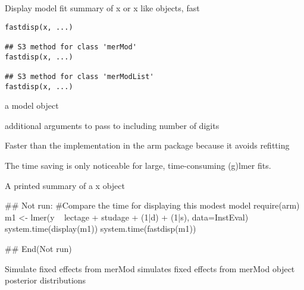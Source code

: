 \documentclass[letterpaper]{book}
\begin{document}
%
\begin{Description}\relax
Display model fit summary of x or x like objects, fast
\end{Description}
%
\begin{Usage}
\begin{verbatim}
fastdisp(x, ...)

## S3 method for class 'merMod'
fastdisp(x, ...)

## S3 method for class 'merModList'
fastdisp(x, ...)
\end{verbatim}
\end{Usage}
%
\begin{Arguments}
\begin{ldescription}
\item[\code{x}] a model object

\item[\code{...}] additional arguments to pass to 
including number of digits
\end{ldescription}
\end{Arguments}
%
\begin{Details}\relax
Faster than the implementation in the arm package because it avoids refitting

The time saving is only noticeable for large, time-consuming (g)lmer
fits.
\end{Details}
%
\begin{Value}
A printed summary of a x object
\end{Value}
%
\begin{SeeAlso}\relax
{}
\end{SeeAlso}
%
\begin{Examples}
\begin{ExampleCode}
## Not run: 
#Compare the time for displaying this modest model
require(arm)
m1 <- lmer(y ~ lectage + studage + (1|d) + (1|s), data=InstEval)
system.time(display(m1))
system.time(fastdisp(m1))

## End(Not run)
\end{ExampleCode}
\end{Examples}
%
\begin{Description}\relax
Simulate fixed effects from merMod
 simulates fixed effects from merMod object posterior distributions
\end{Description}
\end{document}
